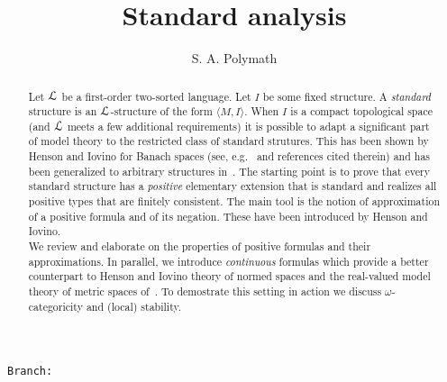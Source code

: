 \documentclass{amsproc}
\author{S. A. Polymath}
\newcommand\branch{}
\begin{document}
\title{Standard analysis}
\hfill\texttt{Branch:\ \branch\ \DTMnow}\bigskip
\maketitle
\raggedbottom

\begin{abstract}
  Let ${\EuScript L}$ be a first-order two-sorted language.
  Let $I$ be some fixed structure.
  A \textit{standard\/} structure is an ${\EuScript L}$-structure of the form $\langle M,I\rangle$.
  When $I$ is a compact topological space (and ${\EuScript L}$ meets a few additional requirements) it is possible to adapt a significant part of model theory to the restricted class of standard strutures.
  This has been shown by Henson and Iovino for Banach spaces (see, e.g.~\cite{HI} and references cited therein) and has been generalized to arbitrary structures in~\cite{clcl}.
  The starting point is to prove that every standard structure has a \textit{positive\/} elementary extension that is standard and realizes all positive types that are finitely consistent.
  The main tool is the notion of approximation of a positive formula and of its negation.
  These have been introduced by Henson and Iovino.\\[1ex]
  \noindent
  We review and elaborate on the properties of positive formulas and their approximations.
  In parallel, we introduce \textit{continuous\/} formulas which provide a better counterpart to Henson and Iovino theory of normed spaces and the real-valued model theory of metric spaces of~\cite{BBHU}.
  To demostrate this setting in action we discuss $\omega$-categoricity and (local) stability.
\end{abstract}


\end{document}
